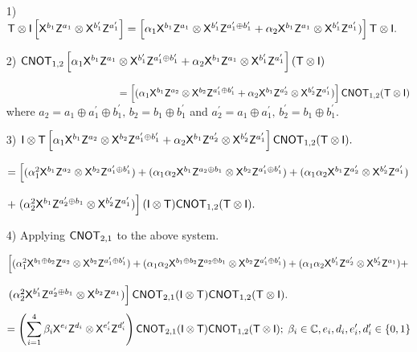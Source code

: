  \begin{enumerate}
\item[1)]  ${\sf T}\otimes {\sf I} \left[{\sf X}^{b_1}{\sf Z}^{a_1}\otimes {\sf X}^{b_1^\prime}{\sf Z}^{a_1^\prime}\right]=\left[\alpha_1 {\sf X}^{b_1}{\sf Z}^{a_1} \otimes {\sf X}^{b_1^\prime}{\sf Z}^{a_1^\prime \oplus b_1^\prime} + \alpha_2 {\sf X}^{b_1}{\sf Z}^{a_1} \otimes {\sf X}^{b_1^\prime}{\sf Z}^{a_1^\prime})\right]{\sf T}\otimes {\sf I}.$
\item[2)] ${\sf CNOT}_{1,2}\left[\alpha_1 {\sf X}^{b_1}{\sf Z}^{a_1} \otimes {\sf X}^{b_1^\prime}{\sf Z}^{a_1^\prime \oplus b_1^\prime} + \alpha_2 {\sf X}^{b_1}{\sf Z}^{a_1} \otimes {\sf X}^{b_1^\prime}{\sf Z}^{a_1^\prime}\right] ({\sf T}\otimes {\sf I})$

$\hspace{3.9cm}=\left[(\alpha_1 \xgate^{b_1}\zgate^{a_2} \otimes \xgate^{b_2}\zgate^{a_1^\prime \oplus b_1^\prime} + \alpha_2 \xgate^{b_1}\zgate^{a_2^\prime} \otimes \xgate^{b_2^\prime}\zgate^{a_1^\prime})\right]\cnot_{1,2}(\tgate\otimes \igate)$\\
where $a_2=a_1 \oplus a_1^\prime \oplus b_1^\prime,\, b_2=b_1 \oplus b_1^\prime$  and  $a_2^\prime=a_1 \oplus a_1^\prime,\, b_2^\prime=b_1 \oplus b_1^\prime.$
\item[3)] ${\sf I}\otimes {\sf T} \left[\alpha_1 {\sf X}^{b_1}{\sf Z}^{a_2} \otimes {\sf X}^{b_2}{\sf Z}^{a_1^\prime \oplus b_1^\prime} + \alpha_2 {\sf X}^{b_1}{\sf Z}^{a_2^\prime} \otimes {\sf X}^{b_2^\prime}{\sf Z}^{a_1^\prime}\right]{\sf CNOT}_{1,2}({\sf T}\otimes {\sf I}).$

$=\left[(\alpha_1^2 {\sf X}^{b_1}{\sf Z}^{a_2} \otimes {\sf X}^{b_2}{\sf Z}^{a_1^\prime \oplus b_1^\prime})+(\alpha_1\alpha_2 {\sf X}^{b_1}{\sf Z}^{a_2\oplus b_1} \otimes {\sf X}^{b_2}{\sf Z}^{a_1^\prime \oplus b_1^\prime})+ (\alpha_1\alpha_2 {\sf X}^{b_1}{\sf Z}^{a_2^\prime} \otimes {\sf X}^{b_2^\prime}{\sf Z}^{a_1^\prime})\right.$

$+ \left.(\alpha_2^2 {\sf X}^{b_1}{\sf Z}^{a_2^\prime \oplus b_1} \otimes {\sf X}^{b_2^\prime}{\sf Z}^{a_1^\prime})\right] ({\sf I}\otimes {\sf T}){\sf CNOT}_{1,2}({\sf T}\otimes {\sf I}).$
\item[4)] Applying ${\sf CNOT}_{2,1}$ to the above system.

$\left[(\alpha_1^2 {\sf X}^{b_1\oplus b_2}{\sf Z}^{a_2} \otimes {\sf X}^{b_2}{\sf Z}^{a_1^\prime \oplus b_1^\prime})+(\alpha_1\alpha_2 {\sf X}^{b_1\oplus b_2}{\sf Z}^{a_2\oplus b_1} \otimes {\sf X}^{b_2}{\sf Z}^{a_1^\prime \oplus b_1^\prime})+ (\alpha_1\alpha_2 {\sf X}^{b_1^\prime}{\sf Z}^{a_2^\prime} \otimes {\sf X}^{b_2^\prime}{\sf Z}^{a_1})+\right.$

$\left.(\alpha_2^2 {\sf X}^{b_1^\prime}{\sf Z}^{a_2^\prime \oplus b_1} \otimes {\sf X}^{b_2}{\sf Z}^{a_1})\right] {\sf CNOT}_{2,1}({\sf I}\otimes {\sf T}){\sf CNOT}_{1,2}({\sf T}\otimes {\sf I}).$
$$=\left(\sum_{i=1}^{4} \beta_i {\sf X}^{e_i}{\sf Z}^{d_i}\otimes {\sf X}^{e_i^\prime}{\sf Z}^{d_i^\prime}\right){\sf CNOT}_{2,1}({\sf I}\otimes {\sf T}){\sf CNOT}_{1,2}({\sf T}\otimes {\sf I});\; \beta_i\in \mathbb{C}, e_i,d_i,e_i^\prime,d_i^\prime \in\{0,1\}$$
\end{enumerate}

